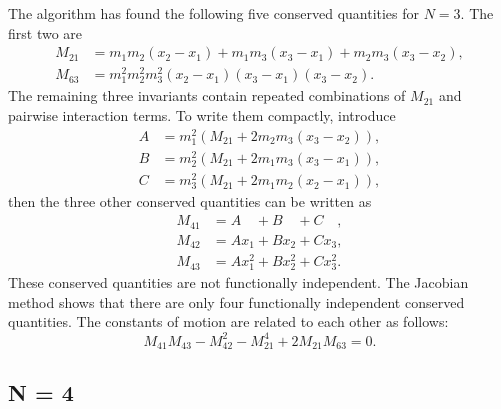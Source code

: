 \documentclass[english,master]{liumaiex}
\theoremstyle{thesisplain}
\theoremstyle{thesisdefinition}
\numberwithin{equation}{section}
\begin{document}
The algorithm has found the following five conserved quantities for $N = 3$.  The first two are
\begin{align}
	M_{21} &= m_1m_2(x_2 - x_1) + m_1m_3(x_3 - x_1) + m_2m_3(x_3 - x_2), \\
	M_{63} &= m_1^2m_2^2m_3^2(x_2 - x_1)(x_3 - x_1)(x_3 - x_2).
\end{align}
The remaining three invariants contain repeated combinations of $M_{21}$ and pairwise interaction terms. To write them compactly, introduce
\begin{align}
	A & = m_1^2(M_{21} + 2m_2m_3(x_3-x_2)), \\
	B & = m_2^2(M_{21} + 2m_1m_3(x_3-x_1)), \\
	C & = m_3^2(M_{21} + 2m_1m_2(x_2-x_1)),
\end{align}
then the three other conserved quantities can be written as
\begin{align}
	M_{41} &= A\phantom{x_1} + B\phantom{x_2} + C\phantom{x_3}, \\
	M_{42} &= Ax_1 + Bx_2 + Cx_3, \\
	M_{43} &= Ax_1^2 + Bx_2^2 + Cx_3^2.
\end{align}
These conserved quantities are not functionally independent. The Jacobian method shows that there are only four functionally independent conserved quantities. The constants of motion are related to each other as follows:
\begin{equation}
	M_{41}M_{43} - M_{42}^2 - M_{21}^4 + 2M_{21}M_{63} = 0.
\end{equation}


\subsection*{N = 4}
\end{document}
